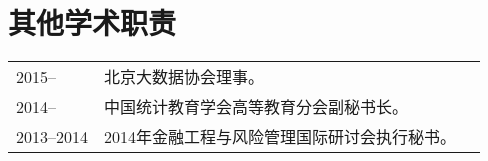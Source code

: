 \documentclass[twoside,a4paper,10pt]{amsart}
\begin{document}
\section*{其他学术职责}
\begin{tabular}{l p{} l}


  2015-- & 北京大数据协会理事。\\

  2014-- & 中国统计教育学会高等教育分会副秘书长。\\

  2013--2014 & 2014年金融工程与风险管理国际研讨会执行秘书。\\




\end{tabular}


\end{document}
